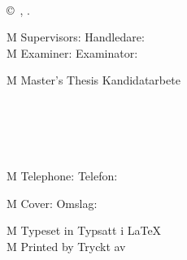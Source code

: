 \begingroup %
\newpage
\thispagestyle{empty}
\vspace*{4.5cm}
\thesisImprintTitle\\
\thesisAuthor \setlength{\parskip}{2\baselineskip}

\copyright~\thesisAuthor, \thesisYear.

\if\thesisType M
    Supervisors:
\else
    Handledare:
\fi
\thesisSupervisor\\
\if\thesisType M
    Examiner:
\else
    Examinator:
\fi
\thesisExaminer

\if\thesisType M
    Master's Thesis
\else
    Kandidatarbete
\fi
\thesisYear\\
\thesisDepartment\\
\thesisDivision\\
\ifx\thesisGroup\undefined
\else
\thesisGroup\\
\fi
\thesisUniversity\\
\thesisImprintLocation\\
\if\thesisType M
    Telephone:
\else
    Telefon:
\fi
\thesisUniversityTel

\vfill
\ifx\thesisCoverFigure\undefined
\else
    \if\thesisType M
        Cover:
    \else
        Omslag:
    \fi
    \thesisCoverFigureCaption
    \setlength{\parskip}{\baselineskip}
\fi

\if\thesisType M
    Typeset in
\else
    Typsatt i
\fi
\LaTeX\\
\ifx\thesisPrintedBy\undefined
\else
    \if\thesisType M
        Printed by
    \else
        Tryckt av
    \fi
    \thesisPrintedBy\\
\fi
\thesisLocation\ \thesisYear
\endgroup
